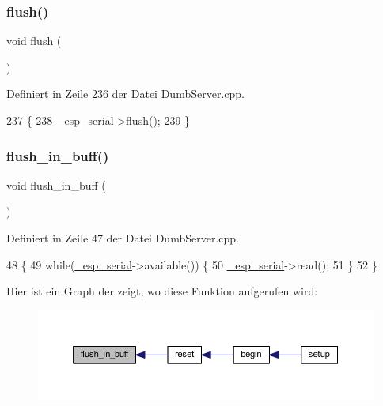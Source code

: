 \subsubsection{\texorpdfstring{flush()}{flush()}}
{\footnotesize\ttfamily void flush (\begin{DoxyParamCaption}{ }\end{DoxyParamCaption})\hspace{0.3cm}{\ttfamily [virtual]}}



Definiert in Zeile 236 der Datei Dumb\+Server.\+cpp.


\begin{DoxyCode}
237 \{
238   \hyperlink{class_esp_server_a552aab874ad99b696f4c997d6f5a4746}{\_esp\_serial}->flush();
239 \}
\end{DoxyCode}
\mbox{\label{class_esp_server_a1d791edc8eca304acc71f702f07c0437}} 
\subsubsection{\texorpdfstring{flush\+\_\+in\+\_\+buff()}{flush\_in\_buff()}}
{\footnotesize\ttfamily void flush\+\_\+in\+\_\+buff (\begin{DoxyParamCaption}{ }\end{DoxyParamCaption})\hspace{0.3cm}{\ttfamily [private]}}



Definiert in Zeile 47 der Datei Dumb\+Server.\+cpp.


\begin{DoxyCode}
48 \{
49   \textcolor{keywordflow}{while}(\hyperlink{class_esp_server_a552aab874ad99b696f4c997d6f5a4746}{\_esp\_serial}->available()) \{
50     \hyperlink{class_esp_server_a552aab874ad99b696f4c997d6f5a4746}{\_esp\_serial}->read();
51   \}
52 \}
\end{DoxyCode}
Hier ist ein Graph der zeigt, wo diese Funktion aufgerufen wird\+:\nopagebreak
\begin{figure}[H]
\begin{center}
\leavevmode
\includegraphics[width=350pt]{class_esp_server_a1d791edc8eca304acc71f702f07c0437_icgraph}
\end{center}
\end{figure}
\mbox{\label{class_esp_server_a01953c4cc039c37f94dc3e1057126abb}} 

